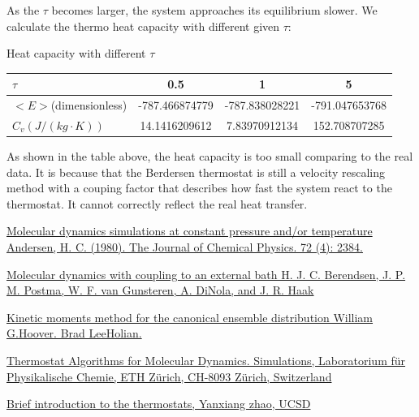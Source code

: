 \documentclass{article}
\begin{document}
\begin{spacing}{1}
As the $\tau$ becomes larger, the system approaches its equilibrium slower. We calculate the thermo heat capacity with different given $\tau$:


\begin{center}
Heat capacity with different $\tau$

\begin{tabular}{lccc}
\hline
$\tau$ & 0.5 & 1 & 5\\ \hline  
$<E>$(dimensionless) & -787.466874779 & -787.838028221 & -791.047653768 \\
$C_v(J/(kg\cdot K))$ & 14.1416209612 & 7.83970912134 & 152.708707285 \\\hline
\end{tabular}
\end{center}

As shown in the table above, the heat capacity is too small comparing to the real data. It is because that the Berdersen thermostat is still a velocity rescaling method with a couping factor that describes how fast the system react to the thermostat. It cannot correctly reflect the real heat transfer.


\end{spacing}
\begin{thebibliography}{1}

\href {http://aip.scitation.org/doi/10.1063/1.439486}{Molecular dynamics simulations at constant pressure and/or temperature Andersen, H. C. (1980). The Journal of Chemical Physics. 72 (4): 2384.}

\href {https://doi.org/10.1063/1.448118}{Molecular dynamics with coupling to an external bath H. J. C. Berendsen, J. P. M. Postma, W. F. van Gunsteren, A. DiNola, and J. R. Haak}

\href {http://www.sciencedirect.com/science/article/pii/0375960195009736?via%3Dihub}{Kinetic moments method for the canonical ensemble distribution
William G.Hoover. Brad LeeHolian.}

\href {https://doi.org/10.1007/b99427}{Thermostat Algorithms for Molecular Dynamics. Simulations, Laboratorium für Physikalische Chemie, ETH Zürich, CH-8093 Zürich, Switzerland}

\href {http://www.math.ucsd.edu/~y1zhao/ResearchNotes/ResearchNote007Thermostat.pdf}{Brief introduction to the thermostats, Yanxiang zhao, UCSD}

 
\end{thebibliography}
\end{document}
